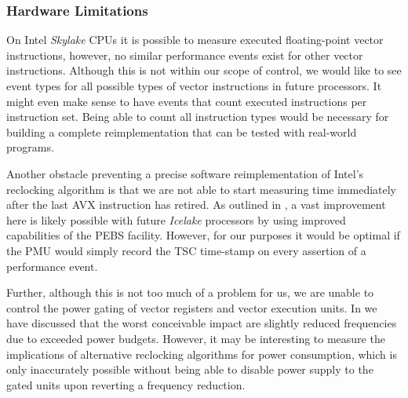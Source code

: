 \subsubsection{Hardware Limitations}
\label{sec:conclusion:futurework:hardware}

On Intel \textit{Skylake} \glspl{CPU} it is possible to measure executed floating-point vector instructions, however, no similar performance events exist for other vector instructions. Although this is not within our scope of control, we would like to see event types for all possible types of vector instructions in future processors. It might even make sense to have events that count executed instructions per instruction set. Being able to count all instruction types would be necessary for building a complete reimplementation that can be tested with real-world programs.

Another obstacle preventing a precise software reimplementation of Intel's reclocking algorithm is that we are not able to start measuring time immediately after the last \gls{AVX} instruction has retired. As outlined in , a vast improvement here is likely possible with future \textit{Icelake} processors by using improved capabilities of the \gls{PEBS} facility. However, for our purposes it would be optimal if the \gls{PMU} would simply record the \gls{TSC} time-stamp on every assertion of a performance event.

Further, although this is not too much of a problem for us, we are unable to control the power gating of vector registers and vector execution units. In  we have discussed that the worst conceivable impact are slightly reduced frequencies due to exceeded power budgets. However, it may be interesting to measure the implications of alternative reclocking algorithms for power consumption, which is only inaccurately possible without being able to disable power supply to the gated units upon reverting a frequency reduction.